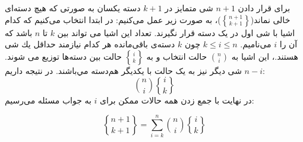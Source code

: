 \p
برای قرار دادن
$n+1$
شی متمایز در
$k+1$
دسته یکسان به صورتی که هیچ دسته‌ای خالی نماند($\genfrac{\{}{\}}{0pt}{}{n + 1}{k + 1}$)، به صورت زیر عمل می‌کنیم:
در ابتدا انتخاب می‌کنیم که کدام اشیا با شی اول در یک دسته قرار نگیرند.
تعداد این اشیا می تواند بین
$k$ تا $n$ 
 باشد
 که آن را $i$ می‌نامیم.
 $k \leq i \leq n$
چون
$k$
دسته‌ی باقی‌مانده هر کدام نیازمند حداقل يك شی هستند.،
   این اشیا به
${n\choose i}$ 
حالت انتخاب 
و به 
$\genfrac{\{}{\}}{0pt}{}{i}{k}$
حالت بین دسته‌ها توزیع می شوند.
$n-i$ 
شی دیگر نیز به یک حالت با یکدیگر هم‌دسته مي‌باشند. در نتیجه داریم:
$${n\choose i} \genfrac{\{}{\}}{0pt}{}{i}{k}$$
\p
در نهایت با جمع زدن همه حالات ممکن برای $i$ به جواب مسئله می‌رسیم:

$$\genfrac{\{}{\}}{0pt}{}{n + 1}{k + 1} = \sum\limits_{i=k}^{n} {n\choose i} \genfrac{\{}{\}}{0pt}{}{i}{k}$$




